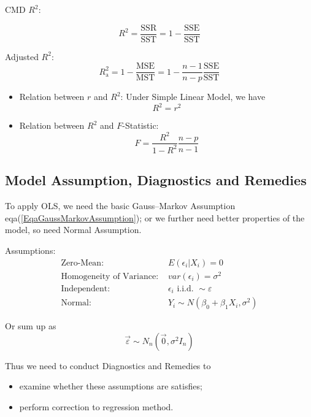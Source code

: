 \begin{itemize}[topsep=2pt,itemsep=2pt]
    CMD $ R^2 $:

    \[
        R^2=\dfrac{\mathrm{SSR}}{\mathrm{SST}}=1-\dfrac{\mathrm{SSE}}{\mathrm{SST}}
    \]

    Adjusted $ R^2 $:
    \[
        R^2_\mathrm{a}=1-\dfrac{\mathrm{MSE}}{\mathrm{MST}} =1-\dfrac{n-1}{n-p}\dfrac{\mathrm{SSE}}{\mathrm{SST}}
    \]
    
    \begin{itemize}[topsep=2pt,itemsep=2pt]
        \item Relation between $ r $ and $ R^2 $: Under Simple Linear Model, we have 
        \[
            R^2=r^2 
        \]
        \item Relation between $ R^2 $ and $ F $-Statistic:
        \[
            F=\dfrac{R^2}{1-R^2}\dfrac{n-p}{n-1} 
        \]
    \end{itemize}
\end{itemize}






\subsection{Model Assumption, Diagnostics and Remedies}

    To apply OLS, we need the basic Gauss–Markov Assumption eqa(\ref{EqaGaussMarkovAssumption}); or we further need better properties of the model, so need Normal Assumption.
    
    Assumptions:
    \begin{equation}
        \begin{aligned}
            \text{Zero-Mean: }&E(\epsilon_i|X_i)=0 \\
            \text{Homogeneity of Variance: }&var(\epsilon_i)=\sigma^2\\
            \text{Independent: }&\epsilon_i\text{ i.i.d. }\sim \varepsilon\\
            \text{Normal: }&Y_i\sim N(\beta _0+\beta _1X_i,\sigma^2)
        \end{aligned}
    \end{equation}
    
    Or sum up as 
    \begin{equation}
        \vec{\varepsilon }\sim N_n(\vec{0},\sigma^2I_n) 
    \end{equation}
    
    
    
    Thus we need to conduct Diagnostics and Remedies to 
    \begin{itemize}[topsep=2pt,itemsep=2pt]
        \item examine whether these assumptions are satisfies;
        \item perform correction to regression method.
    \end{itemize}
